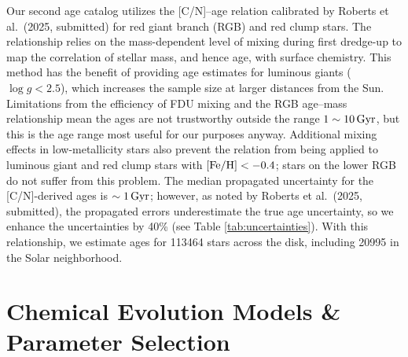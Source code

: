 \documentclass[twocolumn,twocolappendix,linenumbers]{aastex631}
\newcommand{\todo}[1]{{\color{red}#1}}
\newcommand{\mathFeH}{{\rm [Fe/H]}}
\newcommand{\Gyr}{\,{\rm Gyr}}
\begin{document}

Our second age catalog utilizes the [C/N]--age relation calibrated by Roberts et al.\ (2025, submitted) for red giant branch (RGB) and red clump stars. The relationship relies on the mass-dependent level of mixing during first dredge-up \citep[FDU;][]{iben_stellar_1967} to map the correlation of stellar mass, and hence age, with surface chemistry. This method has the benefit of providing age estimates for luminous giants ($\log g<2.5$), which increases the sample size at larger distances from the Sun. Limitations from the efficiency of FDU mixing and the RGB age--mass relationship mean the ages are not trustworthy outside the range $1\sim10\Gyr$, but this is the age range most useful for our purposes anyway. Additional mixing effects in low-metallicity stars %
also prevent the relation from being applied to luminous giant and red clump stars with $\mathFeH<-0.4$; stars on the lower RGB do not suffer from this problem. The median propagated uncertainty for the [C/N]-derived ages is $\sim1\Gyr$; however, as noted by Roberts et al.\ (2025, submitted), the propagated errors underestimate the true age uncertainty, so we enhance the uncertainties by 40\% (see Table \ref{tab:uncertainties}). With this relationship, we estimate ages for \num{113464} stars across the disk, including \num{20995} in the Solar neighborhood.

\section{Chemical Evolution Models \& Parameter Selection}
\label{sec:methods}
\end{document}
